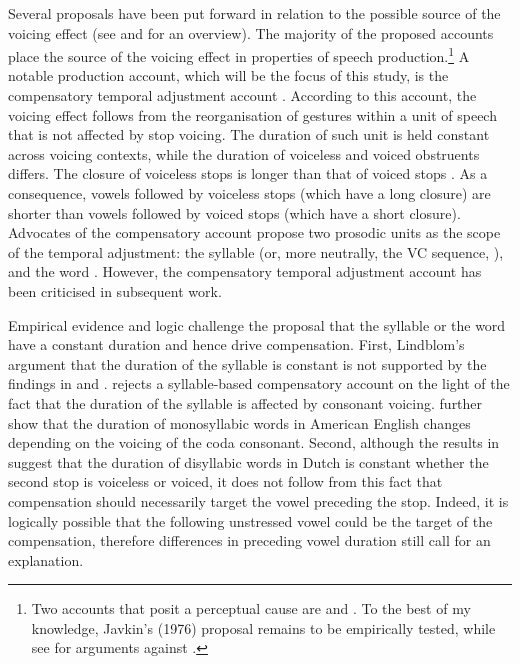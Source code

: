 \documentclass[preprint]{JASAnew}
\begin{document}
Several proposals have been put forward in relation to the possible
source of the voicing effect (see \citealt{soskuthy2013} and
\citealt{begus2017} for an overview). The majority of the proposed
accounts place the source of the voicing effect in properties of speech
production.\footnote{Two accounts that posit a perceptual cause are \citet{javkin1976} and \citet{kluender1988}. To the best of my knowledge, Javkin's (1976) proposal remains to be empirically tested, while see \citet{fowler1992} for arguments against \citet{kluender1988}.}
A notable production account, which will be the focus of this study, is
the compensatory temporal adjustment account
\citep{lindblom1967, slis1969a, slis1969, lehiste1970, lehiste1970a}.
According to this account, the voicing effect follows from the
reorganisation of gestures within a unit of speech that is not affected
by stop voicing. The duration of such unit is held constant across
voicing contexts, while the duration of voiceless and voiced obstruents
differs. The closure of voiceless stops is longer than that of voiced
stops \citep{lisker1957, van-summers1987, davis1989, de-jong1991}. As a
consequence, vowels followed by voiceless stops (which have a long
closure) are shorter than vowels followed by voiced stops (which have a
short closure). Advocates of the compensatory account propose two
prosodic units as the scope of the temporal adjustment: the syllable
(or, more neutrally, the VC sequence, \citealt{lindblom1967}), and the
word \citep{slis1969a, slis1969, lehiste1970, lehiste1970a}. However,
the compensatory temporal adjustment account has been criticised in
subsequent work.

Empirical evidence and logic challenge the proposal that the syllable or
the word have a constant duration and hence drive compensation. First,
Lindblom's \citeyear{lindblom1967} argument that the duration of the
syllable is constant is not supported by the findings in
\citet{chen1970} and \citet{jacewicz2009}. \citet{chen1970} rejects a
syllable-based compensatory account on the light of the fact that the
duration of the syllable is affected by consonant voicing.
\citet{jacewicz2009} further show that the duration of monosyllabic
words in American English changes depending on the voicing of the coda
consonant. Second, although the results in \citet{slis1969} suggest that
the duration of disyllabic words in Dutch is constant whether the second
stop is voiceless or voiced, it does not follow from this fact that
compensation should necessarily target the vowel preceding the stop.
Indeed, it is logically possible that the following unstressed vowel
could be the target of the compensation, therefore differences in
preceding vowel duration still call for an explanation.
\end{document}
